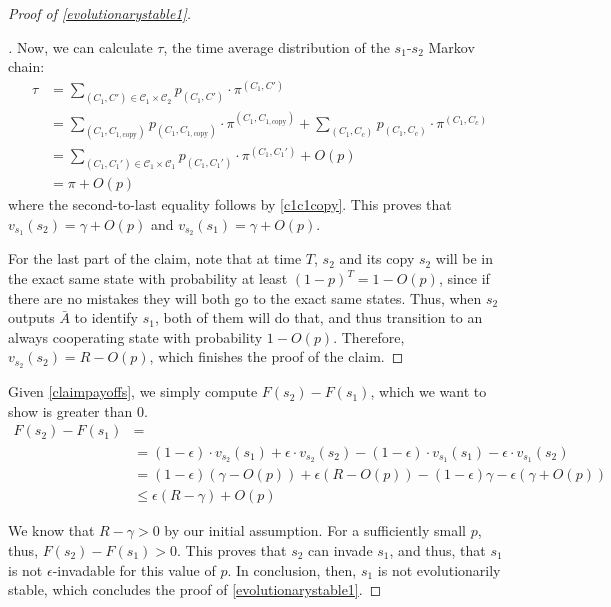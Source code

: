 \documentclass[11pt]{amsart}
\theoremstyle{definition}
\theoremstyle{remark}
\newenvironment{subproof}[1][\proofname]{%
  \renewcommand{\qedsymbol}{$\blacksquare$}%
  \begin{proof}[#1]%
}{%
  \end{proof}%
}
\begin{document}
\begin{proof}[Proof of \cref{evolutionarystable1}]
\begin{subproof}
        Now, we can calculate $\tau$, the time average distribution of the $s_1$-$s_2$ Markov chain:
        \begin{align*}
          \tau &= \sum_{(C_1, C') \in \mathcal{C}_1 \times \mathcal{C}_2} p_{(C_1, C')} \cdot \pi^{(C_1, C')} \\
          &= \sum_{(C_1, C_{1, \text{copy}})} p_{(C_1, C_{1, \text{copy}})} \cdot \pi^{(C_1, C_{1, \text{copy}})} + \sum_{(C_1, C_c)} p_{(C_1, C_c)} \cdot \pi^{(C_1, C_c)} \\
          &= \sum_{(C_1, C_1') \in \mathcal{C}_1 \times \mathcal{C}_1} p_{(C_1, C_1')} \cdot \pi^{(C_1, C_1')} + O(p) \\
          &= \pi + O(p)
        \end{align*}
        where the second-to-last equality follows by \cref{c1c1copy}.  This proves that $v_{s_1}(s_2) = \gamma + O(p)$ and $v_{s_2}(s_1) = \gamma + O(p)$.

        For the last part of the claim, note that at time $T$, $s_2$ and its copy $s_2$ will be in the exact same state with probability at least $(1-p)^T = 1 - O(p)$, since if there are no mistakes they will both go to the exact same states. Thus, when $s_2$ outputs $\bar{A}$ to identify $s_1$, both of them will do that, and thus transition to an always cooperating state with probability $1 - O(p)$. Therefore, $v_{s_2}(s_2) = R - O(p)$, which finishes the proof of the claim.
      \end{subproof}

      Given \cref{claimpayoffs}, we simply compute $F(s_2) - F(s_1)$, which we want to show is greater than 0.
      \begin{align*}
        F(s_2) - F(s_1) &= \\
        &= (1 - \epsilon) \cdot v_{s_2}(s_1) + \epsilon \cdot v_{s_2}(s_2) - (1 - \epsilon) \cdot v_{s_1}(s_1) - \epsilon \cdot v_{s_1}(s_2) \\
        &= (1 - \epsilon) (\gamma - O(p)) + \epsilon (R - O(p)) - (1-\epsilon) \gamma - \epsilon (\gamma + O(p)) \\
        &\leq \epsilon (R - \gamma) + O(p)
      \end{align*}

      We know that $R - \gamma > 0$ by our initial assumption. For a sufficiently small $p$, thus, $F(s_2) - F(s_1) > 0$. This proves that $s_2$ can invade $s_1$, and thus, that $s_1$ is not $\epsilon$-invadable for this value of $p$. In conclusion, then, $s_1$ is not evolutionarily stable, which concludes the proof of \cref{evolutionarystable1}.

    \end{proof}
\end{document}
